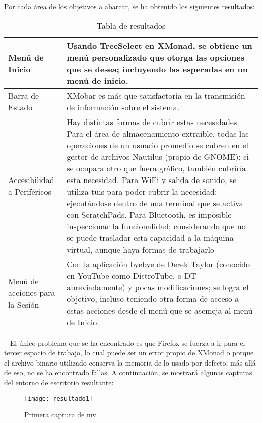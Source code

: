 \normalsize{ \indent
Por cada área de los objetivos a abarcar,
se ha obtenido los siguientes resultados:
}
\begin{table}[ht]
\begin{center}
\begin{tabular}{ |p{2.5cm}|p{10cm}| } 
	\hline
	Menú de Inicio & Usando TreeSelect en
	XMonad, se obtiene un menú personalizado
	que otorga las opciones que se desea;
	incluyendo las esperadas en un menú
	de inicio. \\
	\hline
	Barra de Estado & XMobar es más que
	satisfactoria en la transmisión de
	información sobre el sistema. \\
	\hline
	Accesibilidad a Periféricos & Hay
	distintas formas de cubrir estas
	necesidades. Para el área de
	almacenamiento extraíble, todas
	las operaciones de un usuario
	promedio se cubren en el gestor
	de archivos Nautilus (propio de GNOME);
	si se ocupara otro que fuera gráfico,
	también cubriría esta necesidad.
	Para WiFi y salida de sonido, se
	utiliza \acrshort{tui}s para poder
	cubrir la necesidad; ejecutándose
	dentro de una terminal que se activa
	con ScratchPads. Para Bluetooth, es
	imposible inspeccionar la funcionalidad;
	considerando que no se puede trasladar
	esta capacidad a la máquina virtual,
	aunque haya formas de trabajarlo\\ 
	\hline
	Menú de acciones para la Sesión & Con
	la aplicación byebye de Derek Taylor
	(conocido en YouTube como DistroTube,
	o DT abreviadamente) y pocas
	modificaciones; se logra el objetivo,
	incluso teniendo otra forma de
	acceso a estas acciones desde el
	menú que se asemeja al menú de
	Inicio.\\ 
	\hline
\end{tabular}
\end{center}
\caption{Tabla de resultados}
\label{resultados}
\end{table}
\ \newline
\normalsize{ \indent
El único problema que se ha encontrado es
que Firefox se fuerza a ir para el tercer
espacio de trabajo, lo cual puede ser un
error propio de XMonad o porque el archivo
binario utilizado conserva la memoria de
lo usado por defecto; más allá de eso,
no se ha encontrado fallas.
}
\newline
\normalsize{ \indent
A continuación, se mostrará algunas
capturas del entorno de escritorio
resultante:
}
\newpage
\begin{figure}[!ht]
  \caption{Primera captura de \acrshort{mv}}
  \centering
  \texttt{[image: resultado1]}
\end{figure}
